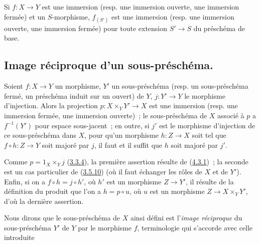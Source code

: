 \begin{corollary}[4.3.2]
\label{I.4.3.2-fr}
Si $f:X\to Y$ est une immersion (resp. une immersion ouverte, une immersion
fermée) et un $S$-morphisme, $f_{(S')}$ est une immersion (resp. une immersion
ouverte, une immersion fermée) pour toute extension $S'\to S$ du préschéma de
base.
\end{corollary}

\subsection{Image réciproque d'un sous-préschéma.}
\label{subsection:I.4.4-fr}

\begin{proposition}[4.4.1]
\label{I.4.4.1-fr}
Soient $f:X\to Y$ un morphisme, $Y'$ un sous-préschéma (resp. un
sous-préschéma fermé, un préschéma induit sur un ouvert) de $Y$, $j:Y'\to Y$
le morphisme d'injection. Alors la projection $p:X\times_Y Y'\to X$ est une
immersion (resp. une immersion fermée, une immersion ouverte)~; le
sous-préschéma de $X$ associé à $p$ a $f^{-1}(Y')$ pour espace sous-jacent~;
en outre, si $j'$ est le morphisme d'injection de ce sous-préschéma dans $X$,
pour qu'un morphisme $h:Z\to X$ soit tel que $f\circ h:Z\to Y$ soit majoré
par $j$, il faut et il suffit que $h$ soit majoré par $j'$.
\end{proposition}

Comme $p=1_X\times_Y j$ (\hyperref[I.3.3.4-fr]{3.3.4}), la première assertion
résulte de (\hyperref[I.4.3.1-fr]{4.3.1})~; la seconde est un cas particulier
de (\hyperref[I.3.5.10-fr]{3.5.10}) (où il faut échanger les rôles de $X$ et
de $Y'$). Enfin, si on a $f\circ h=j\circ h'$, où $h'$ est un morphisme
$Z\to Y'$, il résulte de la définition du produit que l'on a $h=p\circ u$,
où $u$ est un morphisme $Z\to X\times_Y Y'$, d'où la dernière assertion.

Nous dirons que le sous-préschéma de $X$ ainsi défini est l'\emph{image
réciproque} du sous-préschéma $Y'$ de $Y$ par le morphisme $f$, terminologie
qui s'accorde avec celle introduite
